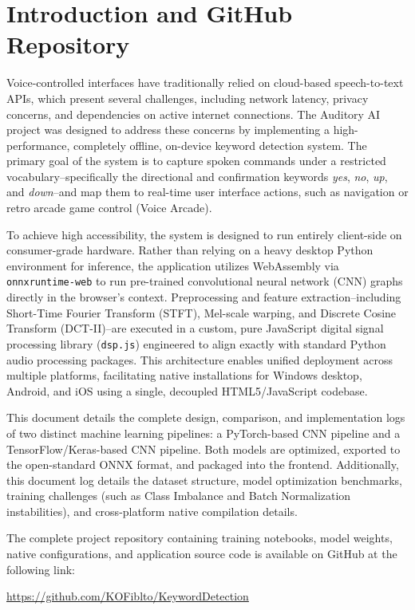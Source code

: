 \documentclass[11pt,a4paper]{article}
\begin{document}
\newpage
\section{Introduction and GitHub Repository}
Voice-controlled interfaces have traditionally relied on cloud-based speech-to-text APIs, which present several challenges, including network latency, privacy concerns, and dependencies on active internet connections. The Auditory AI project was designed to address these concerns by implementing a high-performance, completely offline, on-device keyword detection system. The primary goal of the system is to capture spoken commands under a restricted vocabulary--specifically the directional and confirmation keywords \textit{yes}, \textit{no}, \textit{up}, and \textit{down}--and map them to real-time user interface actions, such as navigation or retro arcade game control (Voice Arcade).

To achieve high accessibility, the system is designed to run entirely client-side on consumer-grade hardware. Rather than relying on a heavy desktop Python environment for inference, the application utilizes WebAssembly via \texttt{onnxruntime-web} to run pre-trained convolutional neural network (CNN) graphs directly in the browser's context. Preprocessing and feature extraction--including Short-Time Fourier Transform (STFT), Mel-scale warping, and Discrete Cosine Transform (DCT-II)--are executed in a custom, pure JavaScript digital signal processing library (\texttt{dsp.js}) engineered to align exactly with standard Python audio processing packages. This architecture enables unified deployment across multiple platforms, facilitating native installations for Windows desktop, Android, and iOS using a single, decoupled HTML5/JavaScript codebase.

This document details the complete design, comparison, and implementation logs of two distinct machine learning pipelines: a PyTorch-based CNN pipeline and a TensorFlow/Keras-based CNN pipeline. Both models are optimized, exported to the open-standard ONNX format, and packaged into the frontend. Additionally, this document log details the dataset structure, model optimization benchmarks, training challenges (such as Class Imbalance and Batch Normalization instabilities), and cross-platform native compilation details.

The complete project repository containing training notebooks, model weights, native configurations, and application source code is available on GitHub at the following link:
\begin{center}
    \url{https://github.com/KOFiblto/KeywordDetection}
\end{center}
\end{document}
